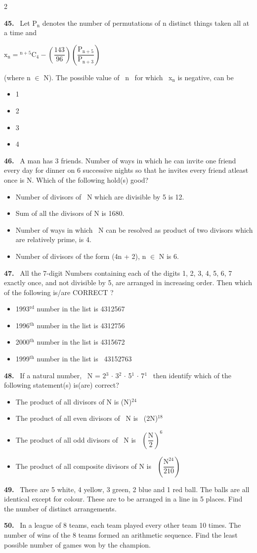 \documentclass[10pt]{extarticle}
\newcommand{\qn}[1]{\par\smallskip\noindent\textbf{#1.}~}
\newenvironment{qoptions}{\begin{itemize}[leftmargin=1.8em,itemsep=1pt,topsep=2pt,label={}]}{\end{itemize}}
\newcommand{\opt}[2]{\item[(#1)] #2}
\begin{document}
\begin{multicols}{2}
\begin{qoptions}
\end{qoptions}
\qn{45} Let P$_\mathrm n$ denotes the number of permutations of n distinct things taken all at a time and\par
$\mathrm x_\mathrm n={}^{\mathrm n+5}\mathrm C_4-\left(\dfrac{143}{96}\right)\left(\dfrac{\mathrm P_{\mathrm n+5}}{\mathrm P_{\mathrm n+3}}\right)$\par
(where n $\in$ N). The possible value of \ n \ for which \ x$_\mathrm n$ is negative, can be
\begin{qoptions}
\opt{A}{1}
\opt{B}{2}
\opt{C}{3}
\opt{D}{4}
\end{qoptions}
\qn{46} A man has 3 friends. Number of ways in which he can invite one friend every day for dinner on 6 successive nights so that he invites every friend atleast once is N. Which of the following hold(s) good?
\begin{qoptions}
\opt{A}{Number of divisors of \ N which are divisible by 5 is 12.}
\opt{B}{Sum of all the divisors of N is 1680.}
\opt{C}{Number of ways in which \ N can be resolved as product of two divisors which are relatively prime, is 4.}
\opt{D}{Number of divisors of the form (4n + 2), n $\in$ N is 6.}
\end{qoptions}
\qn{47} All the 7-digit Numbers containing each of the digits 1, 2, 3, 4, 5, 6, 7 exactly once, and not divisible by 5, are arranged in increasing order. Then which of the following is/are CORRECT ?
\begin{qoptions}
\opt{A}{1993$^\mathrm{rd}$ number in the list is 4312567}
\opt{B}{1996$^\mathrm{th}$ number in the list is 4312756}
\opt{C}{2000$^\mathrm{th}$ number in the list is 4315672}
\opt{D}{1999$^\mathrm{th}$ number in the list is \ 43152763}
\end{qoptions}
\qn{48} If a natural number, \ N = 2$^3$ $\cdot$ 3$^2$ $\cdot$ 5$^1$ $\cdot$ 7$^1$ \ then identify which of the following statement(s) is(are) correct?
\begin{qoptions}
\opt{A}{The product of all divisors of N is (N)$^{24}$}
\opt{B}{The product of all even divisors of \ N is \ (2N)$^{18}$}
\opt{C}{The product of all odd divisors of \ N is \ $\left(\dfrac{\mathrm N}2\right)^6$}
\opt{D}{The product of all composite divisors of N is \ $\left(\dfrac{\mathrm N^{24}}{210}\right)$}
\end{qoptions}
\qn{49} There are 5 white, 4 yellow, 3 green, 2 blue and 1 red ball. The balls are all identical except for colour. These are to be arranged in a line in 5 places. Find the number of distinct arrangements.
\qn{50} In a league of 8 teams, each team played every other team 10 times. The number of wins of the 8 teams formed an arithmetic sequence. Find the least possible number of games won by the champion.

\end{multicols}
\end{document}
